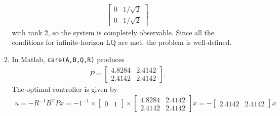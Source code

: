 \documentclass[letterpaper,11pt,titlepage]{article}
\newcommand{\trans}{^\text{T}}
\begin{document}
\begin{enumerate}[leftmargin=0pt]
\begin{enumerate}
\begin{gather}
\begin{bmatrix}
                        0 & 1/\sqrt{2} \\
                        0 & 1/\sqrt{2}
                    \end{bmatrix}
                \end{gather}
                with rank 2, so the system is completely observable. Since all the conditions for infinite-horizon LQ are met, the problem is well-defined.
            \item In Matlab, \texttt{care(A,B,Q,R)} produces
                \begin{gather}
                    P = \begin{bmatrix}
                        4.8284 & 2.4142 \\
                        2.4142 & 2.4142
                    \end{bmatrix}.
                \end{gather}
                The optimal controller is given by
                \begin{gather}
                    u = -R^{-1} B\trans P x
                    = -1^{-1} \times \begin{bmatrix}
                        0 & 1
                    \end{bmatrix} \times
                    \begin{bmatrix}
                        4.8284 & 2.4142 \\
                        2.4142 & 2.4142
                    \end{bmatrix} x
                    = \boxed{- \begin{bmatrix}
                        2.4142 & 2.4142
                    \end{bmatrix} x }
                \end{gather}
        \end{enumerate}


\end{enumerate}
\end{document}

